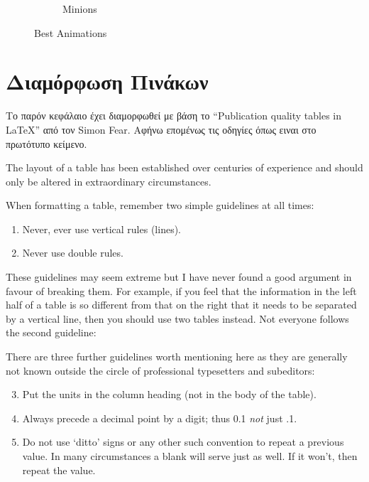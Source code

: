 \begin{landscape}
\begin{figure}
\begin{subfigure}[b]{0.3\textwidth}
    \caption{Minions}
    \label{fig:Minnion}
  \end{subfigure}
  \caption{Best Animations}
  \label{fig:animations}
\end{figure}


\end{landscape}



\section{Διαμόρφωση Πινάκων}

Το παρόν κεφάλαιο έχει διαμορφωθεί με βάση το ``Publication quality tables in \LaTeX*''
 από τον Simon Fear. Αφήνω επομένως τις οδηγίες όπως ειναι στο πρωτότυπο κείμενο.

The layout of a table has been established over centuries of experience and 
should only be altered in extraordinary circumstances. 

When formatting a table, remember two simple guidelines at all times:

\begin{enumerate}
  \item Never, ever use vertical rules (lines).
  \item Never use double rules.
\end{enumerate}

These guidelines may seem extreme but I have
never found a good argument in favour of breaking them. For
example, if you feel that the information in the left half of
a table is so different from that on the right that it needs
to be separated by a vertical line, then you should use two
tables instead. Not everyone follows the second guideline:

There are three further guidelines worth mentioning here as they
are generally not known outside the circle of professional
typesetters and subeditors:

\begin{enumerate}\setcounter{enumi}{2}
  \item Put the units in the column heading (not in the body of
          the table).
  \item Always precede a decimal point by a digit; thus 0.1
      {\em not} just .1.
  \item Do not use `ditto' signs or any other such convention to
      repeat a previous value. In many circumstances a blank
      will serve just as well. If it won't, then repeat the value.
\end{enumerate}

